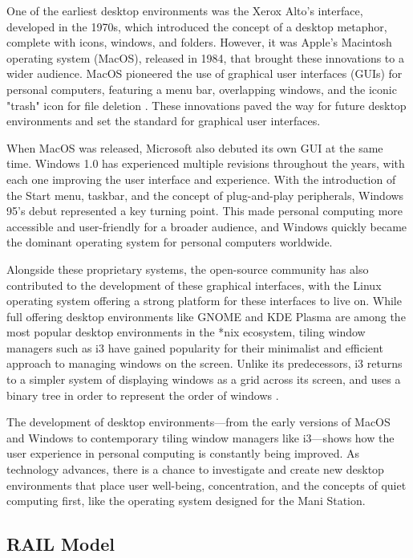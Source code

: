 \documentclass[letterpaper,twocolumn,10pt]{article}
\begin{document}
One of the earliest desktop environments was the Xerox Alto's interface, developed in the 1970s, which introduced the concept of a desktop metaphor, complete with icons, windows, and folders. However, it was Apple's Macintosh operating system (MacOS), released in 1984, that brought these innovations to a wider audience. MacOS pioneered the use of graphical user interfaces (GUIs) for personal computers, featuring a menu bar, overlapping windows, and the iconic "trash" icon for file deletion \cite{macos}. These innovations paved the way for future desktop environments and set the standard for graphical user interfaces.

When MacOS was released, Microsoft also debuted its own GUI at the same time. Windows 1.0 has experienced multiple revisions throughout the years, with each one improving the user interface and experience. With the introduction of the Start menu, taskbar, and the concept of plug-and-play peripherals, Windows 95's debut represented a key turning point. This made personal computing more accessible and user-friendly for a broader audience, and Windows quickly became the dominant operating system for personal computers worldwide. \cite{win95}

Alongside these proprietary systems, the open-source community has also contributed to the development of these graphical interfaces, with the Linux operating system offering a strong platform for these interfaces to live on. While full offering desktop environments like GNOME and KDE Plasma are among the most popular desktop environments in the *nix ecosystem, tiling window managers such as i3 have gained popularity for their minimalist and efficient approach to managing windows on the screen. Unlike its predecessors, i3 returns to a simpler system of displaying windows as a grid across its screen, and uses a binary tree in order to represent the order of windows \cite{i3}.

The development of desktop environments—from the early versions of MacOS and Windows to contemporary tiling window managers like i3—shows how the user experience in personal computing is constantly being improved. As technology advances, there is a chance to investigate and create new desktop environments that place user well-being, concentration, and the concepts of quiet computing first, like the operating system designed for the Mani Station.
\newpage
\subsection{RAIL Model}
\end{document}

